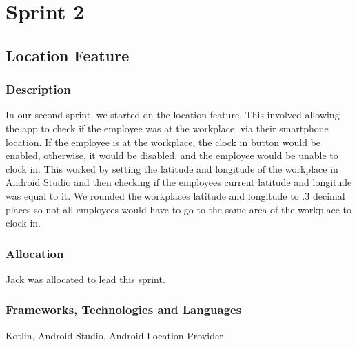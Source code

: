 \section{Sprint 2}
\subsection{Location Feature}
\subsubsection{Description}
In our second sprint, we started on the location feature. This involved allowing the app to check if the employee was at the workplace, via their smartphone location. If the employee is at the workplace, the clock in button would be enabled, otherwise, it would be disabled, and the employee would be unable to clock in. This worked by setting the latitude and longitude of the workplace in Android Studio and then checking if the employees current latitude and longitude was equal to it. We rounded the workplaces latitude and longitude to .3 decimal places so not all employees would have to go to the same area of the workplace to clock in.
\subsubsection{Allocation}
Jack was allocated to lead this sprint.
\subsubsection{Frameworks, Technologies and Languages}
Kotlin, Android Studio, Android Location Provider
